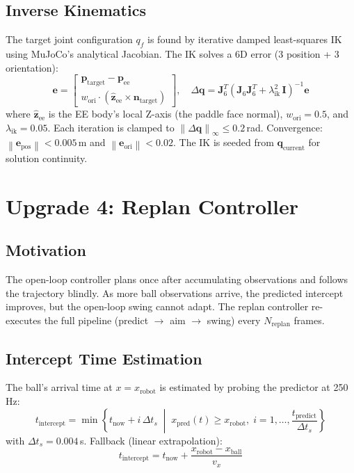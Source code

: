 \documentclass[11pt,letterpaper]{article}
\newcommand{\vv}[1]{\mathbf{#1}}
\newcommand{\norm}[1]{\left\|#1\right\|}
\begin{document}
\subsection{Inverse Kinematics}

The target joint configuration $q_f$ is found by iterative damped least-squares IK using MuJoCo's analytical Jacobian.  The IK solves a 6D error (3 position + 3 orientation):
\begin{equation}
    \vv{e} = \begin{bmatrix} \vv{p}_{\text{target}} - \vv{p}_{\text{ee}} \\ w_{\text{ori}} \cdot (\hat{\vv{z}}_{\text{ee}} \times \vv{n}_{\text{target}}) \end{bmatrix}, \quad
    \Delta\vv{q} = \vv{J}_6^T\!\left(\vv{J}_6\vv{J}_6^T + \lambda_{\text{ik}}^2\,\vv{I}\right)^{-1}\vv{e}
\end{equation}
where $\hat{\vv{z}}_{\text{ee}}$ is the EE body's local Z-axis (the paddle face normal), $w_{\text{ori}} = 0.5$, and $\lambda_{\text{ik}} = 0.05$.  Each iteration is clamped to $\norm{\Delta\vv{q}}_\infty \leq 0.2$\,rad.  Convergence: $\norm{\vv{e}_{\text{pos}}} < 0.005$\,m and $\norm{\vv{e}_{\text{ori}}} < 0.02$.  The IK is seeded from $\vv{q}_{\text{current}}$ for solution continuity.

\section{Upgrade 4: Replan Controller}
\label{sec:replan}

\subsection{Motivation}

The open-loop controller plans once after accumulating observations and follows the trajectory blindly.  As more ball observations arrive, the predicted intercept improves, but the open-loop swing cannot adapt.  The replan controller re-executes the full pipeline (predict $\to$ aim $\to$ swing) every $N_{\text{replan}}$ frames.

\subsection{Intercept Time Estimation}

The ball's arrival time at $x = x_{\text{robot}}$ is estimated by probing the predictor at 250\,Hz:
\begin{equation}
    t_{\text{intercept}} = \min\!\left\{t_{\text{now}} + i\,\Delta t_s \;\middle|\; x_{\text{pred}}(t) \geq x_{\text{robot}},\; i = 1, \ldots, \frac{t_{\text{predict}}}{\Delta t_s}\right\}
\end{equation}
with $\Delta t_s = 0.004$\,s.  Fallback (linear extrapolation):
\begin{equation}
    t_{\text{intercept}} = t_{\text{now}} + \frac{x_{\text{robot}} - x_{\text{ball}}}{v_x}
\end{equation}
\end{document}
